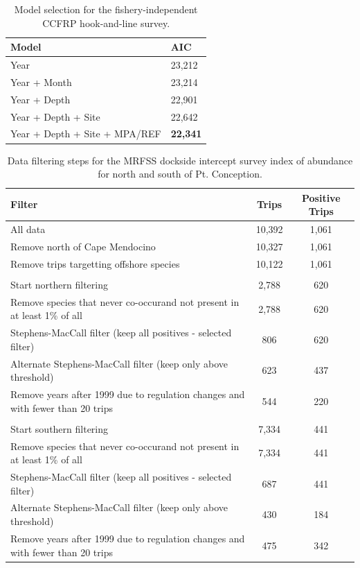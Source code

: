\documentclass[12pt,]{article}
\begin{document}
\vspace{3cm}

\begin{table}[ht]
\centering
\caption{Model selection for the fishery-independent CCFRP hook-and-line survey.} 
\label{tab:Fleet9_AIC}
\begin{tabular}{ll}
  \hline
Model & AIC \\ 
  \hline
Year & 23,212 \\ 
  Year + Month & 23,214 \\ 
  Year + Depth & 22,901 \\ 
  Year + Depth + Site & 22,642 \\ 
  Year + Depth + Site + MPA/REF & \textbf{22,341} \\ 
   \hline
\end{tabular}
\end{table}

\FloatBarrier

\begin{table}[ht]
\centering
\caption{Data filtering steps for the MRFSS dockside intercept survey 
                                           index of abundance for north and south of Pt. Conception.} 
\label{tab:Fleet10_11_Filter}
\begin{tabular}{>{\raggedright}p{4in}cc}
  \hline
Filter & Trips & Positive Trips \\ 
  \hline
All data & 10,392 & 1,061 \\ 
  Remove north of Cape Mendocino & 10,327 & 1,061 \\ 
  Remove trips targetting offshore species & 10,122 & 1,061 \\ 
   &  &  \\ 
  Start northern filtering & 2,788 & 620 \\ 
  Remove species that never co-occurand  not present in at least 1\% of all & 2,788 & 620 \\ 
  Stephens-MacCall filter (keep all positives - selected filter) & 806 & 620 \\ 
  Alternate Stephens-MacCall filter (keep only above threshold) & 623 & 437 \\ 
  Remove years after 1999 due to regulation changes and with fewer than 20 trips & 544 & 220 \\ 
   &  &  \\ 
  Start southern filtering & 7,334 & 441 \\ 
  Remove species that never co-occurand  not present in at least 1\% of all & 7,334 & 441 \\ 
  Stephens-MacCall filter (keep all positives - selected filter) & 687 & 441 \\ 
  Alternate Stephens-MacCall filter (keep only above threshold) & 430 & 184 \\ 
  Remove years after 1999 due to regulation changes and with fewer than 20 trips & 475 & 342 \\ 
   \hline
\end{tabular}
\end{table}
\end{document}

